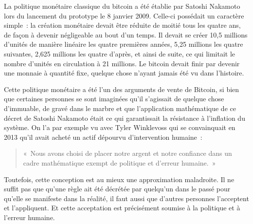 La politique monétaire classique du bitcoin a été établie par Satoshi Nakamoto lors du lancement du prototype le 8 janvier 2009. Celle-ci possédait un caractère simple~: la création monétaire devait être réduite de moitié tous les quatre ans, de façon à devenir négligeable au bout d'un temps. Il devait se créer 10,5 millions d'unités de manière linéaire les quatre premières années, 5,25 millions les quatre suivantes, 2,625 millions les quatre d'après, et ainsi de suite, ce qui limitait le nombre d'unités en circulation à 21 millions. Le bitcoin devait finir par devenir une monnaie à quantité fixe, quelque chose n'ayant jamais été vu dans l'histoire.

Cette politique monétaire a été l'un des arguments de vente de Bitcoin, si bien que certaines personnes se sont imaginées qu'il s'agissait de quelque chose d'immuable, de gravé dans le marbre et que l'application mathématique de ce décret de Satoshi Nakamoto était ce qui garantissait la résistance à l'inflation du système. On l'a par exemple vu avec Tyler Winklevoss qui se convainquait en 2013 qu'il avait acheté un actif dépourvu d'intervention humaine~:

\begin{quote}
«~Nous avons choisi de placer notre argent et notre confiance dans un cadre mathématique exempt de politique et d'erreur humaine.~»
\end{quote} %

Toutefois, cette conception est au mieux une approximation maladroite. Il ne suffit pas que qu'une règle ait été décrétée par quelqu'un dans le passé pour qu'elle se manifeste dans la réalité, il faut aussi que d'autres personnes l'acceptent et l'appliquent. Et cette acceptation est précisément soumise à la politique et à l'erreur humaine.

